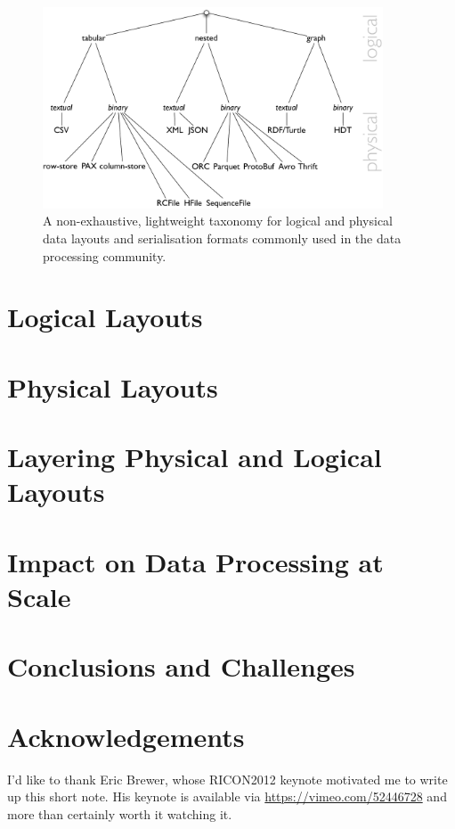 \documentclass{llncs}
\begin{document}
\begin{figure}[h!]
\centering
\includegraphics[width=0.9\textwidth]{taxonomy-dl}
\caption{A non-exhaustive, lightweight taxonomy for logical and physical data 
layouts and serialisation formats commonly used in the data processing 
community.}
\label{fig:taxonomy-dl}
\end{figure}

\section{Logical Layouts}
\label{sec:loglay}

\section{Physical Layouts}
\label{sec:phylay}

\section{Layering Physical and Logical Layouts}
\label{sec:laylay}


\section{Impact on Data Processing at Scale}
\label{sec:ldp}


\section{Conclusions and Challenges}
\label{sec:concl}

\section{Acknowledgements}
\label{sec:ack}
I'd like to thank Eric Brewer, whose RICON2012 keynote motivated me to write up
this short note. His keynote is available via \url{https://vimeo.com/52446728} 
and more than certainly worth it watching it.



\end{document}
